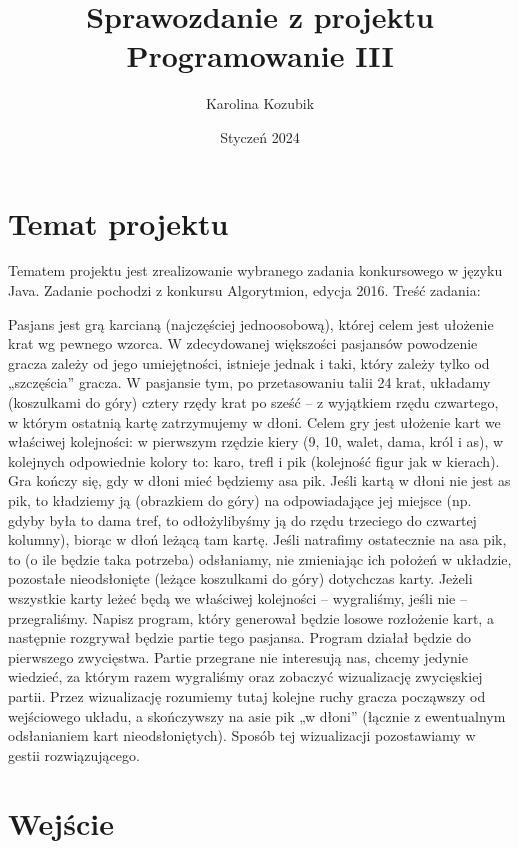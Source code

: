 \documentclass{article}
\title{Sprawozdanie z projektu Programowanie III}
\author{Karolina Kozubik}
\date{Styczeń 2024}
\begin{document}
\maketitle
\section{Temat projektu}

Tematem projektu jest zrealizowanie wybranego zadania konkursowego w języku Java. Zadanie pochodzi z konkursu Algorytmion, edycja 2016.
Treść zadania:


Pasjans jest grą karcianą (najczęściej jednoosobową), której celem jest ułożenie krat wg
pewnego wzorca. W zdecydowanej większości pasjansów powodzenie gracza zależy od jego
umiejętności, istnieje jednak i taki, który zależy tylko od „szczęścia” gracza.
W pasjansie tym, po przetasowaniu talii 24 krat, układamy (koszulkami do góry) cztery
rzędy krat po sześć – z wyjątkiem rzędu czwartego, w którym ostatnią kartę zatrzymujemy w
dłoni. Celem gry jest ułożenie kart we właściwej kolejności: w pierwszym rzędzie kiery (9,
10, walet, dama, król i as), w kolejnych odpowiednie kolory to: karo, trefl i pik (kolejność
figur jak w kierach).
Gra kończy się, gdy w dłoni mieć będziemy asa pik. Jeśli kartą w dłoni nie jest as pik, to
kładziemy ją (obrazkiem do góry) na odpowiadające jej miejsce (np. gdyby była to dama tref,
to odłożylibyśmy ją do rzędu trzeciego do czwartej kolumny), biorąc w dłoń leżącą tam kartę.
Jeśli natrafimy ostatecznie na asa pik, to (o ile będzie taka potrzeba) odsłaniamy, nie
zmieniając ich położeń w układzie, pozostałe nieodsłonięte (leżące koszulkami do góry)
dotychczas karty. Jeżeli wszystkie karty leżeć będą we właściwej kolejności – wygraliśmy,
jeśli nie – przegraliśmy.
Napisz program, który generował będzie losowe rozłożenie kart, a następnie rozgrywał
będzie partie tego pasjansa. Program działał będzie do pierwszego zwycięstwa. Partie
przegrane nie interesują nas, chcemy jedynie wiedzieć, za którym razem wygraliśmy oraz
zobaczyć wizualizację zwycięskiej partii. Przez wizualizację rozumiemy tutaj kolejne ruchy
gracza począwszy od wejściowego układu, a skończywszy na asie pik „w dłoni” (łącznie z
ewentualnym odsłanianiem kart nieodsłoniętych). Sposób tej wizualizacji pozostawiamy w
gestii rozwiązującego. \cite{algorytmion}

\section{Wejście}
\end{document}
